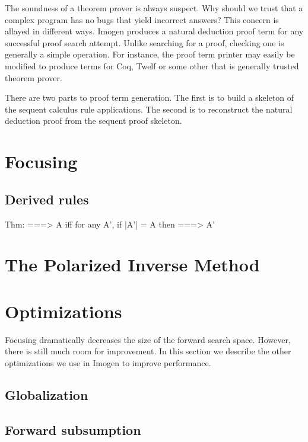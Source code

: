 The soundness of a theorem prover is always suspect.  Why should
we trust that a complex program has no bugs that yield incorrect
answers?  This concern is allayed in different ways.  Imogen
produces a natural deduction proof term for any successful
proof search attempt.  Unlike searching for a proof, checking
one is generally a simple operation.  For instance, the proof term
printer may easily be modified to produce terms for Coq, Twelf or
some other that is generally trusted theorem prover.

There are two parts to proof term generation.  The first is to
build a skeleton of the sequent calculus rule applications.  The
second is to reconstruct the natural deduction proof from the
sequent proof skeleton.





\section{Focusing}\label{prop.sec.focusing}

\subsection{Derived rules}
\label{prop.sec.derived}

Thm: ===> A iff for any A', if |A'| = A then ===> A'

\section{The Polarized Inverse Method}\label{prop.sec.pinverse}

\section{Optimizations}\label{prop.sec.optimize}

Focusing dramatically decreases the size of the forward search space.
However, there is still much room for improvement.  In this section
we describe the other optimizations we use in Imogen to improve
performance.

\subsection{Globalization}

\subsection{Forward subsumption}

